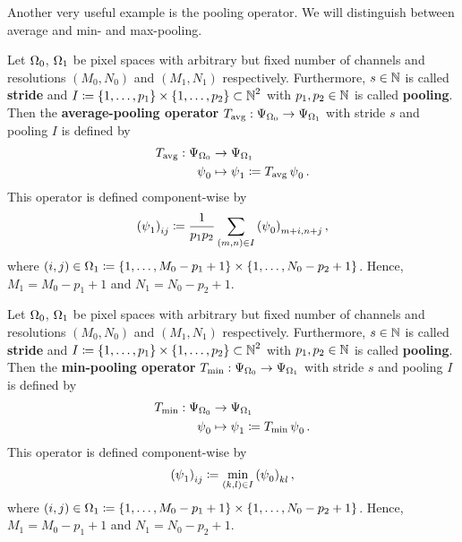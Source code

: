 Another very useful example is the pooling operator. We will distinguish between average and min- and max-pooling.

\begin{definition}\label{def:avg_pooling_op}
Let $\Omega_0$, $\Omega_1$ be pixel spaces with arbitrary but fixed number of channels and resolutions $(M_0,N_0)$ and $(M_1,N_1)$ respectively. Furthermore, $s\in\operatorname{\mathbb{N}}$ is called \textbf{stride} and $I\coloneqq \{1,\ldots,p_1\}\times \{1,\ldots,p_2\} \subset\operatorname{\mathbb{N}}^2$ with $p_1,p_2\in\operatorname{\mathbb{N}}$ is called \textbf{pooling}.\\
Then the \textbf{average-pooling operator} $T_{\text{avg}}: \Psi_{\Omega_0} \to \Psi_{\Omega_1}$ with stride $s$ and pooling $I$ is defined by
\begin{align*}
T_{\text{avg}}: \Psi_{\Omega_0} &\to \Psi_{\Omega_1}\\
\operatorname{\psi}_0 &\mapsto \operatorname{\psi}_1 \coloneqq T_{\text{avg}}\operatorname{\psi}_0 .
\end{align*}
This operator is defined component-wise by
\begin{align}
\left(\operatorname{\psi}_1\right)_{ij} \coloneqq  \frac{1}{p_1p_2} \sum_{(m,n)\in I}\left(\operatorname{\psi}_0\right)_{m+i, n+j},
\end{align}
where $(i,j) \in \Omega_1 \coloneqq \{1,\ldots, M_0-p_1+1\} \times \{1,\ldots, N_0-p_2+1\}$. Hence, $M_1 = M_0-p_1+1$ and $N_1 = N_0-p_2+1$.
\end{definition}

\begin{definition}\label{def:min_pooling_op}
Let $\Omega_0$, $\Omega_1$ be pixel spaces with arbitrary but fixed number of channels and resolutions $(M_0,N_0)$ and $(M_1,N_1)$ respectively. Furthermore, $s\in\operatorname{\mathbb{N}}$ is called \textbf{stride} and $I\coloneqq \{1,\ldots,p_1\}\times \{1,\ldots,p_2\} \subset\operatorname{\mathbb{N}}^2$ with $p_1,p_2\in\operatorname{\mathbb{N}}$ is called \textbf{pooling}.\\
Then the \textbf{min-pooling operator} $T_{\text{min}}: \Psi_{\Omega_0} \to \Psi_{\Omega_1}$ with stride $s$ and pooling $I$ is defined by
\begin{align*}
T_{\text{min}}: \Psi_{\Omega_0} &\to \Psi_{\Omega_1} \\
\operatorname{\psi}_0 &\mapsto \operatorname{\psi}_1 \coloneqq T_{\text{min}}\operatorname{\psi}_0 .
\end{align*}
This operator is defined component-wise by
\begin{align}
\left(\operatorname{\psi}_1\right)_{ij} \coloneqq  \min_{(k,l)\in I} \left(\operatorname{\psi}_0\right)_{kl},
\end{align}
where $(i,j) \in \Omega_1 \coloneqq \{1,\ldots, M_0-p_1+1\} \times \{1,\ldots, N_0-p_2+1\}$. Hence, $M_1 = M_0-p_1+1$ and $N_1 = N_0-p_2+1$.
\end{definition}

